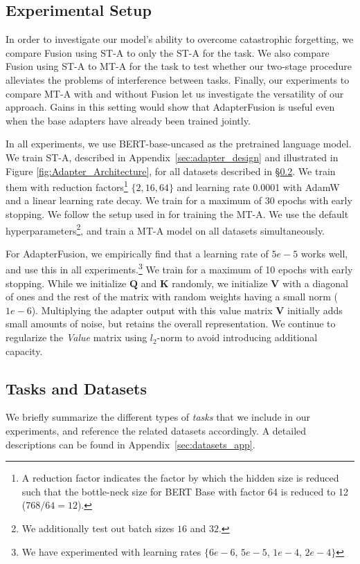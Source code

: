 \subsection{Experimental Setup}
\label{sec:setup} 

In order to investigate our model's ability to overcome catastrophic forgetting, we compare Fusion using ST-A to only the ST-A for the task. We also compare Fusion using ST-A to MT-A for the task to test whether our two-stage procedure alleviates the problems of interference between tasks. Finally, our experiments to compare MT-A with and without Fusion let us investigate the versatility of our approach. Gains in this setting would show that AdapterFusion is useful even when the base adapters have already been trained jointly. 

In all experiments, we use BERT-base-uncased \cite{devlin2018bert} as the pretrained language model. We train ST-A, described in Appendix~\ref{sec:adapter_design} and illustrated in Figure \ref{fig:Adapter_Architecture}, for all datasets described in \S \ref{sec:datasets}. We train them with reduction factors\footnote{A reduction factor indicates the factor by which the hidden size is reduced such that the bottle-neck size for BERT Base with factor 64 is reduced to 12 ($768/64=12$). } $\{2,16,64\}$ and learning rate 0.0001 with AdamW and a linear learning rate decay. We train for a maximum of 30 epochs with early stopping. We follow the setup used in \citet{stickland2019bert} for training the MT-A. We use the default hyperparameters\footnote{We additionally test out batch sizes $16$ and $32$.}, and train a MT-A model on all datasets simultaneously.

For AdapterFusion, we empirically find that a learning rate of $5e-5$ works well, and use this in all experiments.\footnote{We have experimented with learning rates $\{6e-6$, $ 5e-5$, $1e-4$, $2e-4\}$} We train for a maximum of 10 epochs with early stopping. While we initialize $\textbf{Q}$ and $\textbf{K}$ randomly, we initialize $\textbf{V}$ with a diagonal of ones and the rest of the matrix with random weights having a small norm ($1e-6$). Multiplying the adapter output with this value matrix $\textbf{V}$  initially adds small amounts of noise, but retains the overall representation. We continue to regularize the \textit{Value} matrix using $l_2$-norm to avoid introducing additional capacity.

\subsection{Tasks and Datasets}
\label{sec:datasets} 
We briefly summarize the different types of \emph{tasks} that we include in our experiments, and reference the related datasets accordingly. A detailed descriptions can be found in Appendix~\ref{sec:datasets_app}.  

